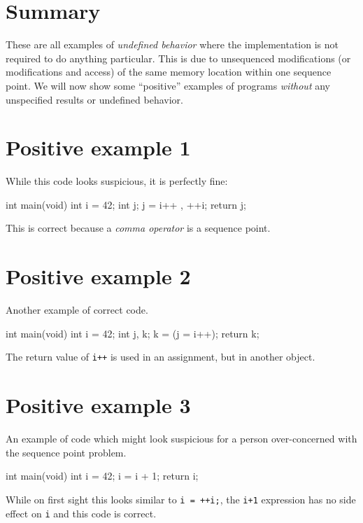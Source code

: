\section{Summary}
These are all examples of \emph{undefined behavior} where the implementation is not required to do anything particular. This is due to unsequenced modifications (or modifications and access) of the same memory location within one sequence point. We will now show some ``positive'' examples of programs \emph{without} any unspecified results or undefined behavior.

\section{Positive example 1}
While this code looks suspicious, it is perfectly fine:
\\\begin{code}
int main(void){
    int i = 42;
    int j;
    j = i++ , ++i;
    return j;
}
\end{code}

This is correct because a \emph{comma operator} is a sequence point.

\section{Positive example 2}
Another example of correct code.
\\\begin{code}
int main(void){
    int i = 42;
    int j, k;
    k = (j = i++);
    return k;
}
\end{code}

The return value of \verb|i++| is used in an assignment, but in another object.

\section{Positive example 3}
An example of code which might look suspicious for a person over-concerned with the sequence point problem.
\\\begin{code}
int main(void){
    int i = 42;
    i = i + 1;
    return i;
}
\end{code}

While on first sight this looks similar to \verb|i = ++i;|, the \verb|i+1| expression has no side effect on \verb|i| and this code is correct.

